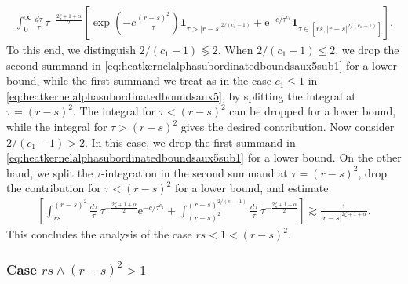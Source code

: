 \documentclass[12pt,reqno,a4paper]{amsart}
\theoremstyle{definition}
\theoremstyle{remark}
\numberwithin{equation}{section}
\newcommand{\1}{\mathbbm{1}}
\newcommand{\me}[1]{\mathrm{e}^{#1}}
\newcommand{\one}{\mathbf{1}}
\begin{document}
\begin{align}
  \label{eq:heatkernelalphasubordinatedboundsaux5sub1}
  \int_0^\infty \frac{d\tau}{\tau}\, \tau^{-\frac{2\zeta+1+\alpha}{2}} \left[\! \exp\left(-c\frac{(r-s)^2}{\tau}\right)\one_{\tau>|r-s|^{2/(c_1-1)}} + \me{-c/\tau^{c_1}}\one_{\tau\in[rs,|r-s|^{2/(c_1-1)}]} \!\right]\!.
\end{align}
To this end, we distinguish $2/(c_1-1)\lessgtr2$. When $2/(c_1-1)\leq2$, we drop the second summand in \eqref{eq:heatkernelalphasubordinatedboundsaux5sub1} for a lower bound, while the first summand we treat as in the case $c_1\leq1$ in \eqref{eq:heatkernelalphasubordinatedboundsaux5}, by splitting the integral at $\tau=(r-s)^2$. The integral for $\tau<(r-s)^2$ can be dropped for a lower bound, while the integral for $\tau>(r-s)^2$ gives the desired contribution. Now consider $2/(c_1-1)>2$. In this case, we drop the first summand in \eqref{eq:heatkernelalphasubordinatedboundsaux5sub1} for a lower bound. On the other hand, we split the $\tau$-integration in the second summand at $\tau=(r-s)^2$, drop the contribution for $\tau<(r-s)^2$ for a lower bound, and estimate
\begin{align}
  \left[\int_{rs}^{(r-s)^2} \frac{d\tau}{\tau}\,\tau^{-\frac{2\zeta+1+\alpha}{2}}\me{-c/\tau^{c_1}} + \int_{(r-s)^2}^{(r-s)^{2/(c_1-1)}} \frac{d\tau}{\tau}\,\tau^{-\frac{2\zeta+1+\alpha}{2}} \right]
  \gtrsim \frac{1}{|r-s|^{2\zeta+1+\alpha}}.
\end{align}
This concludes the analysis of the case $rs<1<(r-s)^2$.


\subsubsection{Case $rs\wedge(r-s)^2>1$}
\end{document}
